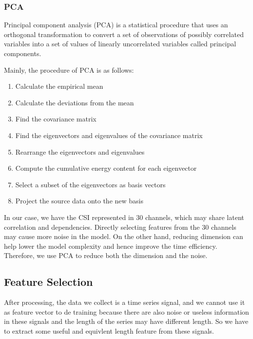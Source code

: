 \documentclass[conference]{IEEEtran}
\begin{document}
\subsubsection{PCA}
Principal component analysis (PCA) is a statistical procedure that uses an orthogonal transformation to convert a set of observations of possibly correlated variables into a set of values of linearly uncorrelated variables called principal components. 

Mainly, the procedure of PCA is as follows:
\begin{enumerate}
	\item Calculate the empirical mean
	\item Calculate the deviations from the mean
	\item Find the covariance matrix
	\item Find the eigenvectors and eigenvalues of the covariance matrix
	\item Rearrange the eigenvectors and eigenvalues
	\item Compute the cumulative energy content for each eigenvector
	\item Select a subset of the eigenvectors as basis vectors
	\item Project the source data onto the new basis
\end{enumerate}

In our case, we have the CSI represented in 30 channels, which may share latent correlation and dependencies. Directly selecting features from the 30 channels may cause more noise in the model.
On the other hand, reducing dimension can help lower the model complexity and hence improve the time efficiency.
Therefore, we use PCA to reduce both the dimension and the noise.

\subsection{Feature Selection}
After processing, the data we collect is a time series signal, and we cannot use it as feature vector to de training because there are also noise or useless information in these signals and the length of the series may have different length. So we have to extract some useful and equivlent length feature from these signals.
\end{document}
